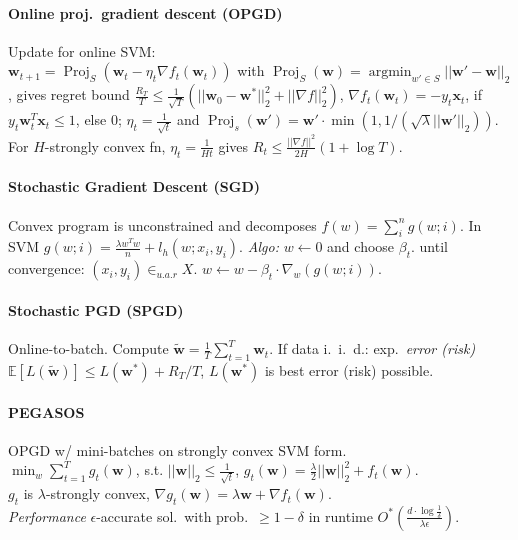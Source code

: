 \documentclass[11pt]{scrartcl}
\DeclareMathOperator{\argmin}{argmin}
\DeclareMathOperator{\Proj}{Proj}
\newcommand{\eps}{\epsilon}
\newcommand{\E}{\mathbb{E}}
\begin{document}
\begin{multicols}{3}
\paragraph{Online proj.\ gradient descent (OPGD)}
Update for online SVM: \\
$\bm w_{t+1} = \Proj_S(\bm w_t-\eta_t\nabla f_t(\bm w_t))$ with $\Proj_S(\bm w) = \argmin_{w'\in S} ||\bm w'-\bm w||_2$, gives regret bound $\frac{R_T}{T}\leq\frac{1}{\sqrt{T}}(||\bm w_0-\bm w^*||_2^2+||\nabla f||_2^2)$, $\nabla f_t(\bm w_t) = -y_t\bm x_t$, if $y_t\bm w_t^T\bm x_t \leq 1$, else $0$;
$\eta_t = \frac{1}{\sqrt{t}}$ and $\Proj_s(\bm w') =  \bm w'\cdot\min\left (1, 1/(\sqrt{\lambda}||\bm w'||_2) \right )$.\\
For $H$-strongly convex fn, $\eta_t = \frac{1}{Ht}$ gives $R_t \leq \frac{||\nabla f||^2}{2H}(1+\log T)$.

\paragraph{Stochastic Gradient Descent (SGD)}
Convex program is unconstrained and decomposes $f(w)=\sum_{i}^n{g(w; i)}$. In SVM $g(w; i) = \frac{\lambda w^Tw}{n} + l_h(w; x_i, y_i)$. \emph{Algo:} $w \leftarrow 0$ and choose $\beta_t$. until convergence: $(x_i,y_i)\in_{u.a.r}X$. $w\leftarrow w - \beta_t \cdot \nabla_w(g(w; i))$.

\paragraph{Stochastic PGD (SPGD)}
Online-to-batch. Compute $\tilde{\bm w} = \frac{1}{T}\sum_{t=1}^{T} \bm w_t$.
If data i.\ i.\ d.: exp.\ \emph{error (risk)} $\E[L(\tilde{\bm w})] \leq L(\bm w^*) + R_T/T$, $L(\bm w^*)$ is best error (risk) possible.

\paragraph{PEGASOS}
OPGD w/ mini-batches on strongly convex SVM form. \\
$\min_w \sum_{t=1}^{T} g_t(\bm w)$, s.t. $||\bm w||_2 \leq \frac{1}{\sqrt t}$, $g_t(\bm w) = \frac{\lambda}{2}||\bm w||_2^2 + f_t(\bm w)$. \\
$g_t$ is $\lambda$-strongly convex, $\nabla g_t(\bm w) = \lambda \bm w + \nabla f_t(\bm w)$. \\
\emph{Performance} $\eps$-accurate sol.\ with prob.\ $\geq 1-\delta$ in runtime $O^*(\frac{d\cdot\log\frac{1}{\delta}}{\lambda\eps}).$


\end{multicols}
\end{document}
